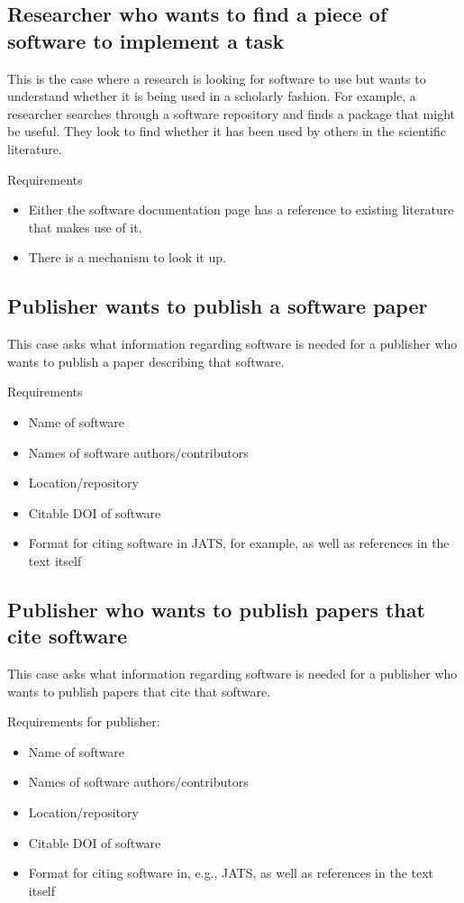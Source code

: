 \documentclass[12pt, oneside]{amsart}
\begin{document}
\subsection{Researcher who wants to find a piece of software to implement a task}

This is the case where a research is looking for software to use but wants to understand whether it is being used in a scholarly fashion.
For example, a researcher searches through a software repository and finds a package that might be useful.
They look to find whether it has been used by others in the scientific literature.

Requirements
\begin{itemize}
\item Either the software documentation page has a reference to existing literature that makes use of it.
\item There is a mechanism to look it up.
\end{itemize}

\subsection{Publisher wants to publish a software paper}

This case asks what information regarding software is needed for a publisher who wants to publish a paper describing that software.

Requirements
\begin{itemize}
\item Name of software
\item Names of software authors/contributors
\item Location/repository
\item Citable DOI of software
\item Format for citing software in JATS, for example, as well as references in the text itself
\end{itemize}

\subsection{Publisher who wants to publish papers that cite software}

This case asks what information regarding software is needed for a publisher who wants to publish papers that cite that software.

Requirements for publisher:
\begin{itemize}
\item Name of software
\item Names of software authors/contributors
\item Location/repository
\item Citable DOI of software
\item Format for citing software in, e.g., JATS, as well as references in the text itself
\end{itemize}
\end{document}
